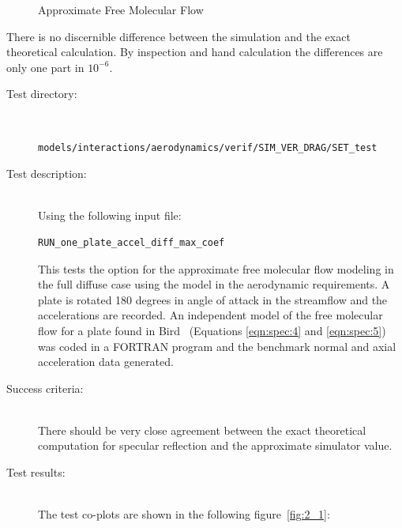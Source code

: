 \begin{description}
\begin{figure}[hbpt]
\caption{Approximate Free Molecular Flow}
\label{fig:1_a}
\end{figure}
There is no discernible difference between the simulation and the exact
theoretical calculation. By inspection and hand calculation the
differences are only one part in $10^{-6}$.
\end{description}

\label{test:amfd}
\begin{description}
\item[Test directory:] \
\begin{verbatim}models/interactions/aerodynamics/verif/SIM_VER_DRAG/SET_test\end{verbatim}
\item[Test description:] \ \\
Using the following input file:
\begin{verbatim}RUN_one_plate_accel_diff_max_coef\end{verbatim}
This tests the option for the approximate free molecular flow
modeling in the full diffuse case using the model in the aerodynamic
requirements. A plate is rotated 180
degrees in angle of attack in the streamflow and the accelerations
are recorded. An independent model of the free molecular flow for a
plate found in Bird~\cite{Bird} (Equations \ref{eqn:spec:4} and \ref{eqn:spec:5}) was
coded in a FORTRAN program and the benchmark normal and axial acceleration
data generated.
\item[Success criteria:] \ \\
There should be very close agreement between the exact theoretical
computation for specular reflection and the approximate simulator
value.
\item[Test results:] \ \\
The test co-plots are shown in the following figure~\ref{fig:2_1}:
\begin{figure}[hbpt]

\end{figure}
\end{description}
